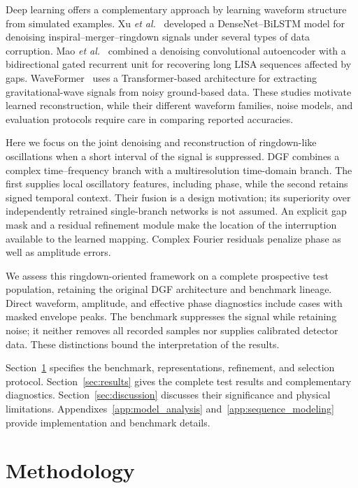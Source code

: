\documentclass[10pt,prd,aps,a4paper,twocolumn,superscriptaddress,nofootinbib,floatfix]{revtex4-2}
\begin{document}
Deep learning offers a complementary approach by learning waveform structure from simulated examples. Xu \textit{et al.}~\cite{Xu_2024} developed a DenseNet--BiLSTM model for denoising inspiral--merger--ringdown signals under several types of data corruption. Mao \textit{et al.}~\cite{Mao:2025cae} combined a denoising convolutional autoencoder with a bidirectional gated recurrent unit for recovering long LISA sequences affected by gaps. WaveFormer~\cite{Wang:2024waveformer} uses a Transformer-based architecture for extracting gravitational-wave signals from noisy ground-based data. These studies motivate learned reconstruction, while their different waveform families, noise models, and evaluation protocols require care in comparing reported accuracies.

Here we focus on the joint denoising and reconstruction of ringdown-like oscillations when a short interval of the signal is suppressed. DGF combines a complex time--frequency branch with a multiresolution time-domain branch. The first supplies local oscillatory features, including phase, while the second retains signed temporal context. Their fusion is a design motivation; its superiority over independently retrained single-branch networks is not assumed. An explicit gap mask and a residual refinement module make the location of the interruption available to the learned mapping. Complex Fourier residuals penalize phase as well as amplitude errors.

We assess this ringdown-oriented framework on a complete prospective test population, retaining the original DGF architecture and benchmark lineage. Direct waveform, amplitude, and effective phase diagnostics include cases with masked envelope peaks. The benchmark suppresses the signal while retaining noise; it neither removes all recorded samples nor supplies calibrated detector data. These distinctions bound the interpretation of the results.

Section~\ref{sec:method} specifies the benchmark, representations, refinement, and selection protocol. Section~\ref{sec:results} gives the complete test results and complementary diagnostics. Section~\ref{sec:discussion} discusses their significance and physical limitations. Appendixes~\ref{app:model_analysis} and~\ref{app:sequence_modeling} provide implementation and benchmark details.

\section{Methodology}\label{sec:method}
\end{document}
